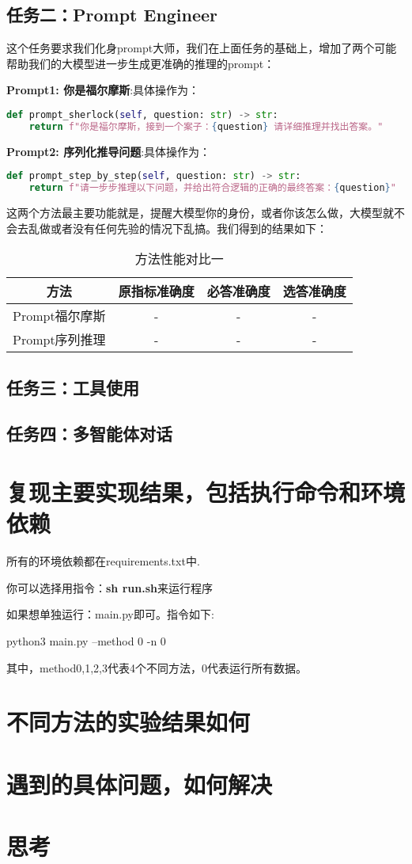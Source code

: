 \documentclass[answers]{exam}  %
\begin{document}
\subsection{任务二：Prompt Engineer}

这个任务要求我们化身prompt大师，我们在上面任务的基础上，增加了两个可能帮助我们的大模型进一步生成更准确的推理的prompt：

\textbf{Prompt1: 你是福尔摩斯}:具体操作为：
\begin{lstlisting}[language=python]
    def prompt_sherlock(self, question: str) -> str:
    return f"你是福尔摩斯，接到一个案子：{question} 请详细推理并找出答案。"
\end{lstlisting}

\textbf{Prompt2: 序列化推导问题}:具体操作为：
\begin{lstlisting}[language=python]
    def prompt_step_by_step(self, question: str) -> str:
    return f"请一步步推理以下问题，并给出符合逻辑的正确的最终答案：{question}"
\end{lstlisting}

这两个方法最主要功能就是，提醒大模型你的身份，或者你该怎么做，大模型就不会去乱做或者没有任何先验的情况下乱搞。我们得到的结果如下：

\begin{table}[h]
    \centering
    \begin{tabular}{cccc}
    \toprule
    \textbf{方法} & \textbf{原指标准确度} & \textbf{必答准确度} &\textbf{选答准确度}\\
    \midrule
    Prompt福尔摩斯 & - & - & - \\
    \hline
    Prompt序列推理 & - & - & - \\
    \bottomrule
    \end{tabular}
    \caption{方法性能对比一}
\end{table}


\subsection{任务三：工具使用}

\subsection{任务四：多智能体对话}

\section{复现主要实现结果，包括执行命令和环境依赖}

所有的环境依赖都在requirements.txt中.

你可以选择用指令：\textbf{sh run.sh}来运行程序

如果想单独运行：main.py即可。指令如下:

python3 main.py --method 0 -n 0

其中，method0,1,2,3代表4个不同方法，0代表运行所有数据。

\section{不同方法的实验结果如何}

\section{遇到的具体问题，如何解决}

\section{思考}
\end{document}
